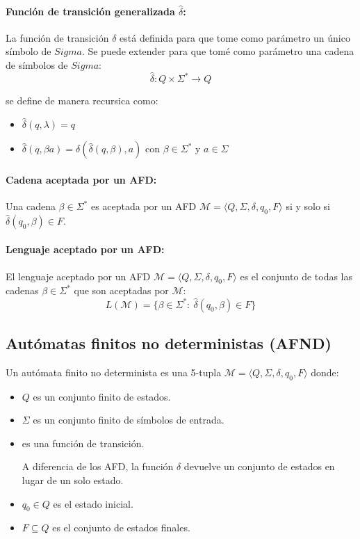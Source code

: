 \paragraph{Función de transición generalizada \(\hat{\delta}\):} La función de transición \(\delta\) está definida para que tome como parámetro un único símbolo de \(Sigma\). Se puede extender para que tomé como parámetro una cadena de símbolos de \(Sigma\):
\[ \hat{\delta} : Q\times\Sigma^*\to Q\]

se define de manera recursica como:
\begin{itemize}
  \item \(\hat{\delta}(q,\lambda)=q\)
  \item \(\hat{\delta}(q,\beta a)=\delta(\hat{\delta}(q,\beta),a)\) con \(\beta\in\Sigma^*\) y \(a\in\Sigma\)
\end{itemize}

\paragraph{Cadena aceptada por un AFD:} Una cadena \(\beta\in\Sigma^*\) es aceptada por un AFD \(\mathcal{M} = \langle Q, \Sigma, \delta, q_0, F\rangle\) si y solo si \(\hat{\delta}(q_0,\beta)\in F\).

\paragraph{Lenguaje aceptado por un AFD:} El lenguaje aceptado por un AFD \(\mathcal{M} = \langle Q, \Sigma, \delta, q_0, F\rangle\) es el conjunto de todas las cadenas \(\beta\in\Sigma^*\) que son aceptadas por \(\mathcal{M}\):
\[ L(\mathcal{M}) = \{ \beta\in\Sigma^*:~\hat{\delta}(q_0,\beta)\in F\}\]

\subsection{Autómatas finitos no deterministas (AFND)}
Un autómata finito no determinista es una 5-tupla \(\mathcal{M}=\langle Q,\Sigma,\delta,q_0,F\rangle\) donde:
\begin{itemize}
  \item \(Q\) es un conjunto finito de estados.
  \item \(\Sigma\) es un conjunto finito de símbolos de entrada.
  \item {} es una función de transición.

        A diferencia de los AFD, la función \(\delta\) devuelve un conjunto de estados en lugar de un solo estado.
  \item \(q_0\in Q\) es el estado inicial.
  \item \(F\subseteq Q\) es el conjunto de estados finales.
\end{itemize}

